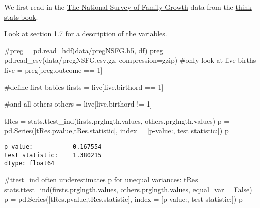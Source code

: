 \documentclass[
  letterpaper,
  DIV=11,
  numbers=noendperiod]{scrreprt}
\newenvironment{Shaded}{\begin{snugshade}}{\end{snugshade}}
\newcommand{\CommentTok}[1]{\textcolor[rgb]{0.37,0.37,0.37}{#1}}
\newcommand{\DecValTok}[1]{\textcolor[rgb]{0.68,0.00,0.00}{#1}}
\newcommand{\NormalTok}[1]{\textcolor[rgb]{0.00,0.23,0.31}{#1}}
\newcommand{\OperatorTok}[1]{\textcolor[rgb]{0.37,0.37,0.37}{#1}}
\newcommand{\StringTok}[1]{\textcolor[rgb]{0.13,0.47,0.30}{#1}}
\newcommand{\VariableTok}[1]{\textcolor[rgb]{0.07,0.07,0.07}{#1}}
\begin{document}
We first read in the
\href{https://greenteapress.com/thinkstats2/html/thinkstats2002.html\#sec7}{The
National Survey of Family Growth} data from the
\href{https://greenteapress.com/wp/think-stats-2e/}{think stats book}.

Look at section 1.7 for a description of the variables.

\begin{Shaded}
\begin{Highlighting}[]
\CommentTok{\#preg = pd.read\_hdf(\textquotesingle{}data/pregNSFG.h5\textquotesingle{}, \textquotesingle{}df\textquotesingle{})}
\NormalTok{preg }\OperatorTok{=}\NormalTok{ pd.read\_csv(}\StringTok{\textquotesingle{}data/pregNSFG.csv.gz\textquotesingle{}}\NormalTok{, compression}\OperatorTok{=}\StringTok{\textquotesingle{}gzip\textquotesingle{}}\NormalTok{)}
\CommentTok{\#only look at live births}
\NormalTok{live }\OperatorTok{=}\NormalTok{ preg[preg.outcome }\OperatorTok{==} \DecValTok{1}\NormalTok{]}

\CommentTok{\#define first babies}
\NormalTok{firsts }\OperatorTok{=}\NormalTok{ live[live.birthord }\OperatorTok{==} \DecValTok{1}\NormalTok{]}

\CommentTok{\#and all others}
\NormalTok{others }\OperatorTok{=}\NormalTok{ live[live.birthord }\OperatorTok{!=} \DecValTok{1}\NormalTok{]}
\end{Highlighting}
\end{Shaded}

\begin{Shaded}
\begin{Highlighting}[]
\NormalTok{tRes }\OperatorTok{=}\NormalTok{ stats.ttest\_ind(firsts.prglngth.values, others.prglngth.values)}
\NormalTok{p }\OperatorTok{=}\NormalTok{ pd.Series([tRes.pvalue,tRes.statistic], index }\OperatorTok{=}\NormalTok{ [}\StringTok{\textquotesingle{}p{-}value:\textquotesingle{}}\NormalTok{, }\StringTok{\textquotesingle{}test statistic:\textquotesingle{}}\NormalTok{])}
\NormalTok{p}
\end{Highlighting}
\end{Shaded}

\begin{verbatim}
p-value:           0.167554
test statistic:    1.380215
dtype: float64
\end{verbatim}

\begin{Shaded}
\begin{Highlighting}[]
\CommentTok{\#ttest\_ind often underestimates p for unequal variances:}
\NormalTok{tRes }\OperatorTok{=}\NormalTok{ stats.ttest\_ind(firsts.prglngth.values, others.prglngth.values, equal\_var }\OperatorTok{=} \VariableTok{False}\NormalTok{)}
\NormalTok{p }\OperatorTok{=}\NormalTok{ pd.Series([tRes.pvalue,tRes.statistic], index }\OperatorTok{=}\NormalTok{ [}\StringTok{\textquotesingle{}p{-}value:\textquotesingle{}}\NormalTok{, }\StringTok{\textquotesingle{}test statistic:\textquotesingle{}}\NormalTok{])}
\NormalTok{p}
\end{Highlighting}
\end{Shaded}
\end{document}
